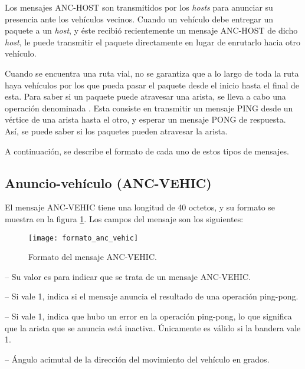 Los mensajes ANC-HOST son transmitidos por los \textit{hosts} para anunciar su
presencia ante los vehículos vecinos. Cuando un vehículo debe entregar un
paquete a un \textit{host}, y éste recibió recientemente un mensaje ANC-HOST de
dicho \textit{host}, le puede transmitir el paquete directamente en lugar de
enrutarlo hacia otro vehículo.

Cuando se encuentra una ruta vial, no se garantiza que a lo largo de toda la
ruta haya vehículos por los que pueda pasar el paquete desde el inicio hasta el
final de esta. Para saber si un paquete puede atravesar una arista, se lleva a
cabo una operación denominada . Esta consiste en transmitir
un mensaje PING desde un vértice de una arista hasta el otro, y esperar un
mensaje PONG de respuesta. Así, se puede saber si los paquetes pueden atravesar
la arista.

A continuación, se describe el formato de cada uno de estos tipos de mensajes.

\subsection{Anuncio-vehículo (ANC-VEHIC)}

\label{subsec:mensaje_anc_vehic}

El mensaje ANC-VEHIC tiene una longitud de 40 octetos, y su formato se muestra
en la figura \ref{fig:formato_anc_vehic}. Los campos del mensaje son los
siguientes:

\begin{figure}[th!]
\centering
\texttt{[image: formato\_anc\_vehic]}
\decoRule
\caption[Formato del mensaje ANC-VEHIC]{Formato del mensaje ANC-VEHIC.}
\label{fig:formato_anc_vehic}
\end{figure}

 -- Su valor es  para indicar que se trata de un
mensaje ANC-VEHIC.

 -- Si vale 1, indica si el mensaje anuncia el resultado de
una operación ping-pong.

 -- Si vale 1, indica que hubo un error en la operación
ping-pong, lo que significa que la arista que se anuncia está inactiva.
Únicamente es válido si la bandera  vale 1.

 -- Ángulo acimutal de la dirección del movimiento
del vehículo en grados.

